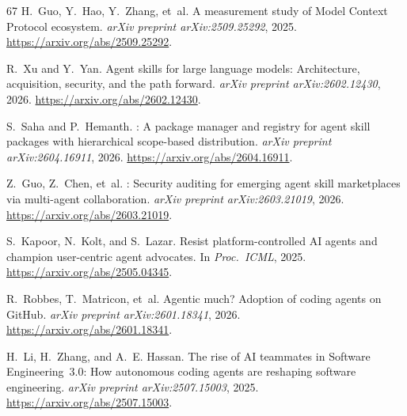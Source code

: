 \documentclass[11pt,a4paper]{article}
\begin{document}
\begin{thebibliography}{67}
H.~Guo, Y.~Hao, Y.~Zhang, et~al.
\newblock A measurement study of {Model Context Protocol} ecosystem.
\newblock \emph{arXiv preprint arXiv:2509.25292}, 2025.
\newblock \url{https://arxiv.org/abs/2509.25292}.

R.~Xu and Y.~Yan.
\newblock Agent skills for large language models: Architecture, acquisition, security, and the path forward.
\newblock \emph{arXiv preprint arXiv:2602.12430}, 2026.
\newblock \url{https://arxiv.org/abs/2602.12430}.

S.~Saha and P.~Hemanth.
: A package manager and registry for agent skill packages with hierarchical scope-based distribution.
\newblock \emph{arXiv preprint arXiv:2604.16911}, 2026.
\newblock \url{https://arxiv.org/abs/2604.16911}.

Z.~Guo, Z.~Chen, et~al.
: Security auditing for emerging agent skill marketplaces via multi-agent collaboration.
\newblock \emph{arXiv preprint arXiv:2603.21019}, 2026.
\newblock \url{https://arxiv.org/abs/2603.21019}.

S.~Kapoor, N.~Kolt, and S.~Lazar.
\newblock Resist platform-controlled {AI} agents and champion user-centric agent advocates.
\newblock In \emph{Proc.\ ICML}, 2025.
\newblock \url{https://arxiv.org/abs/2505.04345}.

R.~Robbes, T.~Matricon, et~al.
\newblock Agentic much? {A}doption of coding agents on {GitHub}.
\newblock \emph{arXiv preprint arXiv:2601.18341}, 2026.
\newblock \url{https://arxiv.org/abs/2601.18341}.

H.~Li, H.~Zhang, and A.~E. Hassan.
\newblock The rise of {AI} teammates in {Software Engineering}~3.0: How autonomous coding agents are reshaping software engineering.
\newblock \emph{arXiv preprint arXiv:2507.15003}, 2025.
\newblock \url{https://arxiv.org/abs/2507.15003}.

\end{thebibliography}
\end{document}
